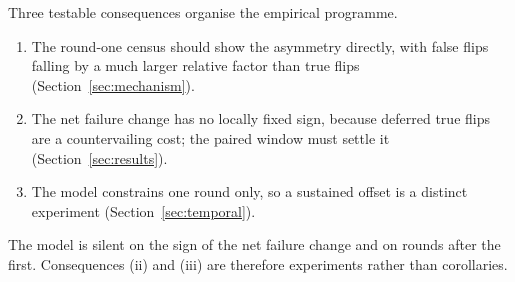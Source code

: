 Three testable consequences organise the empirical programme.
\begin{enumerate}[label=(\roman*),leftmargin=*,itemsep=1pt,topsep=2pt]
\item The round-one census should show the asymmetry directly, with false flips falling by a much larger relative factor than true flips (Section~\ref{sec:mechanism}).
\item The net failure change has no locally fixed sign, because deferred true flips are a countervailing cost; the paired window must settle it (Section~\ref{sec:results}).
\item The model constrains one round only, so a sustained offset is a distinct experiment (Section~\ref{sec:temporal}).
\end{enumerate}
The model is silent on the sign of the net failure change and on rounds after the first. Consequences (ii) and (iii) are therefore experiments rather than corollaries.
